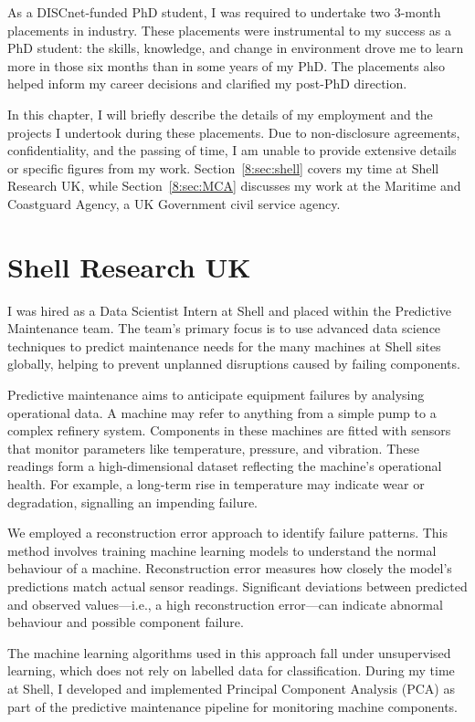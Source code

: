 As a DISCnet-funded PhD student, I was required to undertake two 3-month placements in industry. These placements were instrumental to my success as a PhD student: the skills, knowledge, and change in environment drove me to learn more in those six months than in some years of my PhD. The placements also helped inform my career decisions and clarified my post-PhD direction.

In this chapter, I will briefly describe the details of my employment and the projects I undertook during these placements. Due to non-disclosure agreements, confidentiality, and the passing of time, I am unable to provide extensive details or specific figures from my work. Section~\ref{8:sec:shell} covers my time at Shell Research UK, while Section~\ref{8:sec:MCA} discusses my work at the Maritime and Coastguard Agency, a UK Government civil service agency.

\section{\label{8:sec:shell}Shell Research UK}

I was hired as a Data Scientist Intern at Shell and placed within the Predictive Maintenance team. The team’s primary focus is to use advanced data science techniques to predict maintenance needs for the many machines at Shell sites globally, helping to prevent unplanned disruptions caused by failing components.

Predictive maintenance aims to anticipate equipment failures by analysing operational data. A machine may refer to anything from a simple pump to a complex refinery system. Components in these machines are fitted with sensors that monitor parameters like temperature, pressure, and vibration. These readings form a high-dimensional dataset reflecting the machine's operational health. For example, a long-term rise in temperature may indicate wear or degradation, signalling an impending failure.

We employed a reconstruction error approach to identify failure patterns. This method involves training machine learning models to understand the normal behaviour of a machine. Reconstruction error measures how closely the model's predictions match actual sensor readings. Significant deviations between predicted and observed values---i.e., a high reconstruction error---can indicate abnormal behaviour and possible component failure.

The machine learning algorithms used in this approach fall under unsupervised learning, which does not rely on labelled data for classification. During my time at Shell, I developed and implemented Principal Component Analysis (PCA) as part of the predictive maintenance pipeline for monitoring machine components.

